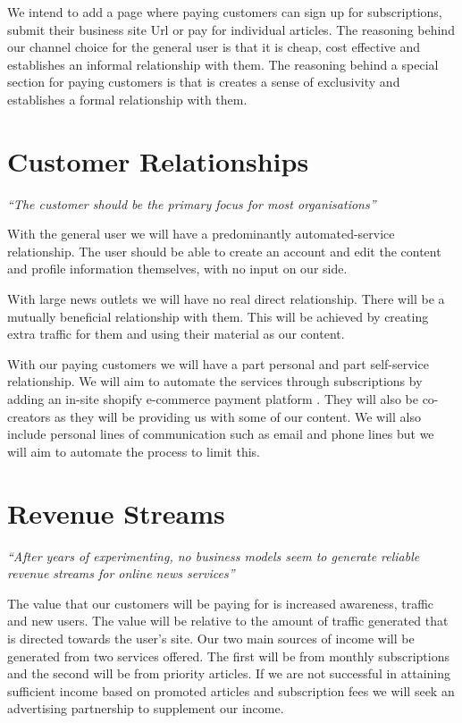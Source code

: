 \documentclass[11pt]{article}
\begin{document}
We intend to add a page where paying customers can sign up for subscriptions, submit their business site Url or pay for individual articles. The reasoning behind our channel choice for the general user is that it is cheap, cost effective and establishes an informal relationship with them. The reasoning behind a special section for paying customers is that is creates a sense of exclusivity and establishes a formal relationship with them.

\section{Customer Relationships}
\begin{center}
\emph{``The customer should be the primary focus for most organisations'' }\cite{swift2001accelerating}
\end{center}

With the general user we will have a predominantly automated-service relationship. The user should be able to create an account and edit the content and profile information themselves, with no input on our side. 

With large news outlets we will have no real direct relationship. There will be a mutually beneficial relationship with them. This will be achieved by creating extra traffic for them and using their material as our content.

With our paying customers we will have a part personal and part self-service relationship. We will aim to automate the services through subscriptions by adding an in-site shopify e-commerce payment platform \cite{shopify}. They will also be co-creators as they will be providing us with some of our content. We will also include personal lines of communication such as email and phone lines but we will aim to automate the process to limit this.

\section{Revenue Streams}


\begin{center}
\emph{``After years of experimenting, no business models seem to generate reliable revenue streams for online news services''}\cite{chyi2005willingness}
\end{center}

The value that our customers will be paying for is increased awareness, traffic and new users. The value will be relative to the amount of traffic generated that is directed towards the user's site. Our two main sources of income will be generated from two services offered. The first will be from monthly subscriptions and the second will be from priority articles. If we are not successful in attaining sufficient income based on promoted articles and subscription fees we will seek an advertising partnership to supplement our income.
\end{document}
